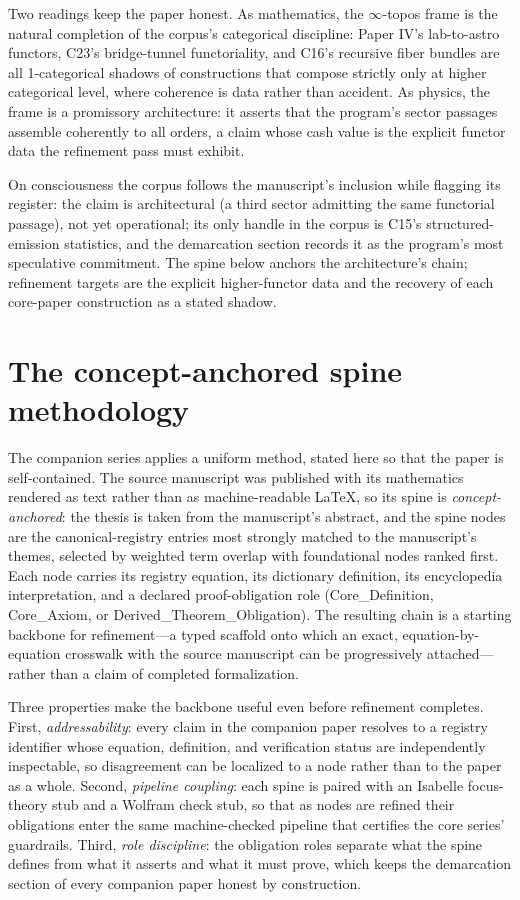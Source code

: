 \documentclass[11pt]{article}
\theoremstyle{remark}
\begin{document}
Two readings keep the paper honest. As mathematics, the $\infty$-topos frame is the natural completion of the corpus's categorical discipline: Paper IV's lab-to-astro functors, C23's bridge-tunnel functoriality, and C16's recursive fiber bundles are all 1-categorical shadows of constructions that compose strictly only at higher categorical level, where coherence is data rather than accident. As physics, the frame is a promissory architecture: it asserts that the program's sector passages assemble coherently to all orders, a claim whose cash value is the explicit functor data the refinement pass must exhibit.

On consciousness the corpus follows the manuscript's inclusion while flagging its register: the claim is architectural (a third sector admitting the same functorial passage), not yet operational; its only handle in the corpus is C15's structured-emission statistics, and the demarcation section records it as the program's most speculative commitment. The spine below anchors the architecture's chain; refinement targets are the explicit higher-functor data and the recovery of each core-paper construction as a stated shadow.

\section{The concept-anchored spine methodology}
\label{sec:method}

The companion series applies a uniform method, stated here so that the paper is self-contained. The source manuscript was published with its mathematics rendered as text rather than as machine-readable LaTeX, so its spine is \emph{concept-anchored}: the thesis is taken from the manuscript's abstract, and the spine nodes are the canonical-registry entries most strongly matched to the manuscript's themes, selected by weighted term overlap with foundational nodes ranked first. Each node carries its registry equation, its dictionary definition, its encyclopedia interpretation, and a declared proof-obligation role (Core\_Definition, Core\_Axiom, or Derived\_Theorem\_Obligation). The resulting chain is a starting backbone for refinement---a typed scaffold onto which an exact, equation-by-equation crosswalk with the source manuscript can be progressively attached---rather than a claim of completed formalization.

Three properties make the backbone useful even before refinement completes. First, \emph{addressability}: every claim in the companion paper resolves to a registry identifier whose equation, definition, and verification status are independently inspectable, so disagreement can be localized to a node rather than to the paper as a whole. Second, \emph{pipeline coupling}: each spine is paired with an Isabelle focus-theory stub and a Wolfram check stub, so that as nodes are refined their obligations enter the same machine-checked pipeline that certifies the core series' guardrails. Third, \emph{role discipline}: the obligation roles separate what the spine defines from what it asserts and what it must prove, which keeps the demarcation section of every companion paper honest by construction.
\end{document}
